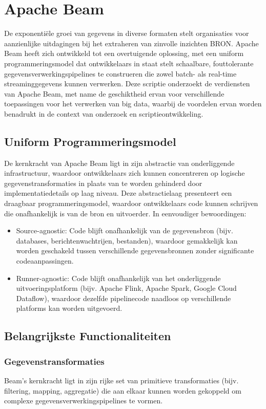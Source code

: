 \section{Apache Beam}

De exponentiële groei van gegevens in diverse formaten stelt organisaties voor aanzienlijke uitdagingen bij het extraheren van zinvolle inzichten {BRON}. Apache Beam heeft zich ontwikkeld tot een overtuigende oplossing, met een uniform programmeringsmodel dat ontwikkelaars in staat stelt schaalbare, fouttolerante gegevensverwerkingspipelines te construeren die zowel batch- als real-time streaminggegevens kunnen verwerken. Deze scriptie onderzoekt de verdiensten van Apache Beam, met name de geschiktheid ervan voor verschillende toepassingen voor het verwerken van big data, waarbij de voordelen ervan worden benadrukt in de context van onderzoek en scriptieontwikkeling.

\subsection{Uniform Programmeringsmodel}

De kernkracht van Apache Beam ligt in zijn abstractie van onderliggende infrastructuur, waardoor ontwikkelaars zich kunnen concentreren op logische gegevenstransformaties in plaats van te worden gehinderd door implementatiedetails op laag niveau. Deze abstractielaag presenteert een draagbaar programmeringsmodel, waardoor ontwikkelaars code kunnen schrijven die onafhankelijk is van de bron en uitvoerder. In eenvoudiger bewoordingen:
\begin{itemize}
    \item Source-agnostic: Code blijft onafhankelijk van de gegevensbron (bijv. databases, berichtenwachtrijen, bestanden), waardoor gemakkelijk kan worden geschakeld tussen verschillende gegevensbronnen zonder significante codeaanpassingen.
    \item Runner-agnostic: Code blijft onafhankelijk van het onderliggende uitvoeringsplatform (bijv. Apache Flink, Apache Spark, Google Cloud Dataflow), waardoor dezelfde pipelinecode naadloos op verschillende platforms kan worden uitgevoerd.
\end{itemize}

\subsection{Belangrijkste Functionaliteiten}

\subsubsection{Gegevenstransformaties}
Beam's kernkracht ligt in zijn rijke set van primitieve transformaties (bijv. filtering, mapping, aggregatie) die aan elkaar kunnen worden gekoppeld om complexe gegevensverwerkingspipelines te vormen.

